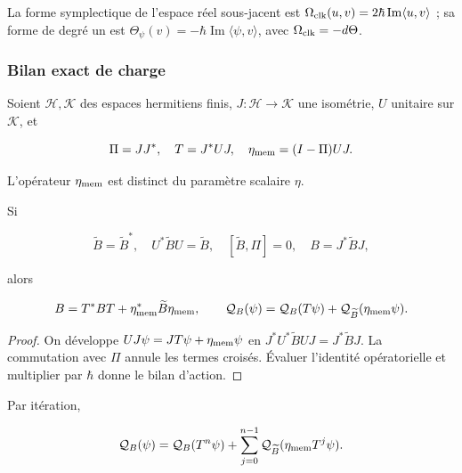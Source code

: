La forme symplectique de l’espace réel sous-jacent est
\(\Omega_{\rm clk}(u,v)=2\hbar\operatorname{Im}\langle u,v\rangle\) ;
sa forme de degré un est
\(\Theta_\psi(v)=-\hbar\operatorname{Im}\langle\psi,v\rangle\),
avec \(\Omega_{\rm clk}=-d\Theta\).

\subsubsection{Bilan exact de charge}

Soient \(\mathcal H,\mathcal K\) des espaces hermitiens finis, \(J:\mathcal H\to\mathcal K\) une isométrie, \(U\) unitaire sur \(\mathcal K\), et


\begin{equation}
\Pi=JJ^*,\quad T=J^*UJ,\quad
\eta_{\rm mem}=(I-\Pi)UJ.
\label{nuc07:eq:15}
\end{equation}

L’opérateur \(\eta_{\rm mem}\) est distinct du paramètre scalaire \(\eta\).

\begin{proposition}
Si

\begin{equation}
\widetilde B=\widetilde B^*,\quad U^*\widetilde BU=\widetilde B,
\quad [\widetilde B,\Pi]=0,\quad B=J^*\widetilde BJ,
\label{nuc07:eq:16}
\end{equation}

alors

\begin{equation}
B=T^*BT+\eta_{\rm mem}^*\widetilde B\eta_{\rm mem},
\qquad
\mathcal Q_B(\psi)=
\mathcal Q_B(T\psi)+\mathcal Q_{\widetilde B}(\eta_{\rm mem}\psi).
\label{nuc07:eq:17}
\end{equation}
\end{proposition}

\begin{proof}
On développe \(UJ\psi=JT\psi+\eta_{\rm mem}\psi\) en
\(J^*U^*\widetilde BUJ=J^*\widetilde BJ\).
La commutation avec \(\Pi\) annule les termes croisés. Évaluer l’identité opératorielle et multiplier par \(\hbar\) donne le bilan d’action.

\end{proof}

Par itération,

\begin{equation}
\mathcal Q_B(\psi)=\mathcal Q_B(T^n\psi)
+\sum_{j=0}^{n-1}\mathcal Q_{\widetilde B}
(\eta_{\rm mem}T^j\psi).
\label{nuc07:eq:18}
\end{equation}

